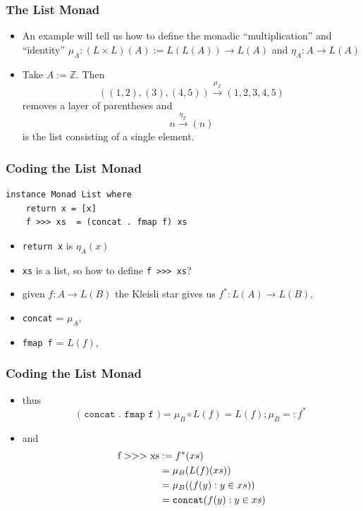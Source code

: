 \documentclass[xcolor=pdftex,dvipsnames,table]{beamer}
\newcommand{\Z}{\ensuremath{\mathbb{Z}}}
\newcommand{\shove}{\ensuremath{\mathtt{>>>}}}
\begin{document}
\begin{frame}
    \frametitle{The List Monad}
    \begin{itemize}
        \item An example will tell us how to define the monadic
            ``multiplication'' and ``identity'' $\mu_A : (L\times
            L)(A) := L(L(A))  \rightarrow L(A)$ and $\eta_A : A
            \rightarrow L(A)$\pause
        \item Take $A := \Z$. \pause
            Then \[ ( (1,2), (3), (4,5) ) \xrightarrow{\mu_\Z}
            (1,2,3,4,5)\] removes a layer of parentheses \pause
            and \[n \xrightarrow{\eta_\Z} (n)\] is the
            list consisting of a single element.
    \end{itemize}
\end{frame}

\begin{frame}[fragile]
    \frametitle{Coding the List Monad}
\begin{lstlisting}
instance Monad List where
    return x = [x]
    f >>> xs  = (concat . fmap f) xs
\end{lstlisting}\pause
    \begin{itemize}
        \item \texttt{return x}  is $\eta_A(x)$\pause
        \item \texttt{xs} is a list, so how to define \verb|f >>> xs|? \pause
        \item given $f: A\rightarrow L(B)$ the Kleisli star gives us
            $f^* : L(A) \rightarrow L(B)$, \pause
        \item \texttt{concat} = $\mu_A$, \pause
        \item \texttt{fmap f} = $L(f)$,
    \end{itemize}
\end{frame}

\begin{frame}[fragile]
    \frametitle{Coding the List Monad}
    \begin{itemize}
        \item thus %
        \[\mathtt{\text{( concat . fmap f )}} = \mu_B \circ L(f) = L(f) ; \mu_B
        =: f^*\] \pause
        \item and %
        \begin{align*}
            \mathtt{\text{f \shove{} xs}} & :=  f^*(xs) \\
            & = \mu_B(L(f)(xs))\\
            & = \mu_B ( (f(y) : y\in xs) ) \\
            & = \mathtt{concat} (f(y) : y \in xs)
        \end{align*}
    \end{itemize}
\end{frame}
\end{document}
